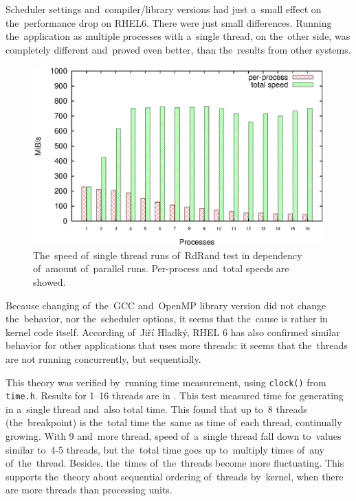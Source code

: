\par{
Scheduler settings and~compiler/library versions had just a~small effect 
on the~performance drop on RHEL6. There were just small differences. 
Running the~application as multiple processes with a~single thread, on the~other side, was completely different and~proved even better, than the~results from other systems.
}

\begin{figure}[h!]
  \centering
 \includegraphics[width=15cm]{fig/tests/r6_parallel.eps} %
\caption{The~speed of~single thread runs of~RdRand test in dependency of~amount of~parallel runs. Per-process and~total speeds are showed.}
\label{fig:testing:r6parallel}
\end{figure}

\par{
Because changing of~the~GCC and~OpenMP library version did not change the~behavior, nor the~scheduler options, it seems that the~cause is rather in kernel code itself. According of~Jiří Hladký, RHEL 6 has also confirmed similar behavior for other applications that uses more threads: it seems that the~threads are not running concurrently, but sequentially.
}

\par{
This theory was verified by~running time measurement, using {\tt clock()} from {\tt time.h}. Results for 1--16 threads are in . This test measured time for generating in a~single thread and~also total time. This found that up to~8 threads (the~breakpoint) is the~total time the~same as time of~each thread, continually growing. With 9 and~more thread, speed of~a~single thread fall down to~values similar to~4-5 threads, but the~total time goes up to~multiply times of~any of~the~thread. Besides, the~times of~the~threads become more fluctuating. This supports the~theory about sequential ordering of~threads by~kernel, when there are more threads than processing units.
}

